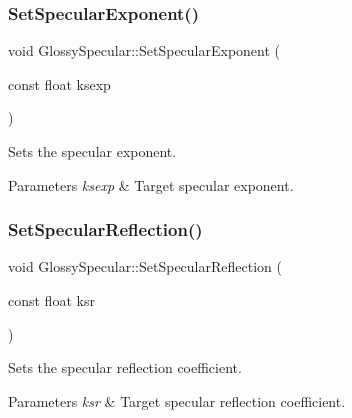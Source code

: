 \subsubsection{\texorpdfstring{Set\+Specular\+Exponent()}{SetSpecularExponent()}}
{\footnotesize\ttfamily void Glossy\+Specular\+::\+Set\+Specular\+Exponent (\begin{DoxyParamCaption}\item[{const float}]{ksexp }\end{DoxyParamCaption})\hspace{0.3cm}{\ttfamily [inline]}}

Sets the specular exponent. 
\begin{DoxyParams}{Parameters}
{\em ksexp} & Target specular exponent. \\
\hline
\end{DoxyParams}
\hypertarget{group___b_r_d_f_gab7e40f362680b631c40530c9c605e3b3}{}\label{group___b_r_d_f_gab7e40f362680b631c40530c9c605e3b3} 
\subsubsection{\texorpdfstring{Set\+Specular\+Reflection()}{SetSpecularReflection()}}
{\footnotesize\ttfamily void Glossy\+Specular\+::\+Set\+Specular\+Reflection (\begin{DoxyParamCaption}\item[{const float}]{ksr }\end{DoxyParamCaption})\hspace{0.3cm}{\ttfamily [inline]}}

Sets the specular reflection coefficient. 
\begin{DoxyParams}{Parameters}
{\em ksr} & Target specular reflection coefficient. \\
\hline
\end{DoxyParams}
